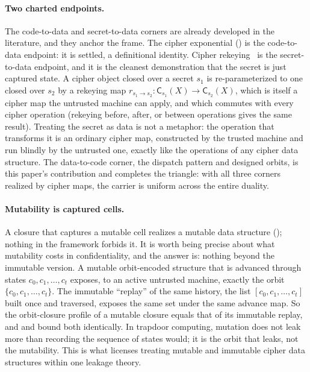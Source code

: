 \documentclass[11pt]{article}
\theoremstyle{definition}
\theoremstyle{plain}
\theoremstyle{definition}
\theoremstyle{remark}
\newcommand{\cipherS}[2]{\mathsf{C}_{#2}(#1)}
\newcommand{\rekey}[2]{r_{#1 \to #2}}
\begin{document}
\paragraph{Two charted endpoints.} The code-to-data and
secret-to-data corners are already developed in the literature, and
they anchor the frame. The cipher exponential
() is the code-to-data endpoint: it is settled,
a definitional identity. Cipher rekeying~\cite{towell2026rekeying} is
the secret-to-data endpoint, and it is the cleanest demonstration that
the secret is just captured state. A cipher object closed over a secret
$s_1$ is re-parameterized to one closed over $s_2$ by a rekeying map
$\rekey{s_1}{s_2} : \cipherS{X}{s_1} \to \cipherS{X}{s_2}$, which is
itself a cipher map the untrusted machine can apply, and which commutes
with every cipher operation (rekeying before, after, or between
operations gives the same result). Treating the secret as data is not a
metaphor: the operation that transforms it is an ordinary cipher map,
constructed by the trusted machine and run blindly by the untrusted
one, exactly like the operations of any cipher data structure. The
data-to-code corner, the dispatch pattern and designed orbits, is this
paper's contribution and completes the triangle: with all three corners
realized by cipher maps, the carrier is uniform across the entire
duality.

\paragraph{Mutability is captured cells.} A closure that captures a
mutable cell realizes a mutable data structure
(); nothing in the framework forbids it. It is
worth being precise about what mutability costs in confidentiality, and
the answer is: nothing beyond the immutable version. A mutable
orbit-encoded structure that is advanced through states $c_0, c_1,
\ldots, c_t$ exposes, to an active untrusted machine, exactly the orbit
$\{c_0, c_1, \ldots, c_t\}$. The immutable \enquote{replay} of the same
history, the list $[c_0, c_1, \ldots, c_t]$ built once and traversed,
exposes the same set under the same advance map. So the orbit-closure
profile of a mutable closure equals that of its immutable replay, and
 and  bound both
identically. In
trapdoor computing, mutation does not leak more than recording the
sequence of states would; it is the orbit that leaks, not the
mutability. This is what licenses treating mutable and immutable cipher
data structures within one leakage theory.
\end{document}

